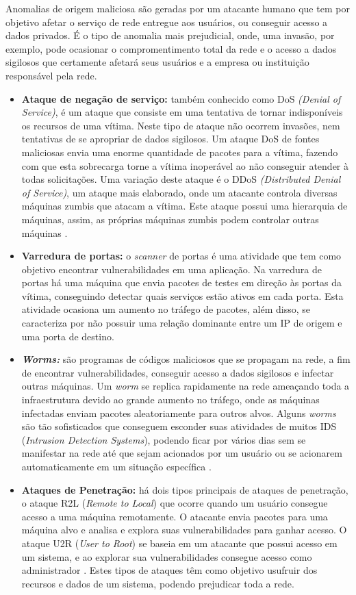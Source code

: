   \indent Anomalias de origem maliciosa são geradas por um atacante humano que tem por objetivo afetar o serviço de rede entregue aos usuários, ou conseguir acesso a dados privados. É o tipo de anomalia mais prejudicial, onde, uma invasão, por exemplo, pode ocasionar o compromentimento total da rede e o acesso a dados sigilosos que certamente afetará seus usuários e a empresa ou instituição responsável pela rede.
  \begin{itemize}
  \item \textbf{Ataque de negação de serviço:} também conhecido como DoS \textit{(Denial of Service)}, é um ataque que consiste em uma tentativa de tornar indisponíveis os recursos de uma vítima. Neste tipo de ataque não ocorrem invasões, nem tentativas de se apropriar de dados sigilosos. Um ataque DoS de fontes maliciosas envia uma enorme quantidade de pacotes para a vítima, fazendo com que esta sobrecarga torne a vítima inoperável ao não conseguir atender à todas solicitações. Uma variação deste ataque é o DDoS \textit{(Distributed Denial of Service)}, um ataque mais elaborado, onde um atacante controla diversas máquinas zumbis que atacam a vítima. Este ataque possui uma hierarquia de máquinas, assim, as próprias máquinas zumbis podem controlar outras máquinas \cite{Lakhina:2004}.
  \item \textbf{Varredura de portas:} o \textit{scanner} de portas é uma atividade que tem como objetivo encontrar vulnerabilidades em uma aplicação. Na varredura de portas há uma máquina que envia pacotes de testes em direção às portas da vítima, conseguindo detectar quais serviços estão ativos em cada porta. Esta atividade ocasiona um aumento no tráfego de pacotes, além disso, se caracteriza por não possuir uma relação dominante entre um IP de origem e uma porta de destino.
  \item \textbf{\textit{Worms:}} são programas de códigos maliciosos que se propagam na rede, a fim de encontrar vulnerabilidades, conseguir acesso a dados sigilosos e infectar outras máquinas. Um \textit{worm} se replica rapidamente na rede ameaçando toda a infraestrutura devido ao grande aumento no tráfego, onde as máquinas infectadas enviam pacotes aleatoriamente para outros alvos. Alguns \textit{worms} são tão sofisticados que conseguem esconder suas atividades de muitos IDS (\textit{Intrusion Detection Systems}), podendo ficar por vários dias sem se manifestar na rede até que sejam acionados por um usuário ou se acionarem automaticamente em um situação específica \cite{Bhuyan}.
  \item \textbf{Ataques de Penetração:} há dois tipos principais de ataques de penetração, o ataque R2L (\textit{Remote to Local}) que ocorre quando um usuário consegue acesso a uma máquina remotamente. O atacante envia pacotes para uma máquina alvo e analisa e explora suas vulnerabilidades para ganhar acesso. O ataque U2R (\textit{User to Root}) se baseia em um atacante que possui acesso em um sistema, e ao explorar sua vulnerabilidades consegue acesso como administrador \cite{Silva2007}. Estes tipos de ataques têm como objetivo usufruir dos recursos e dados de um sistema, podendo prejudicar toda a rede.

\end{itemize}

